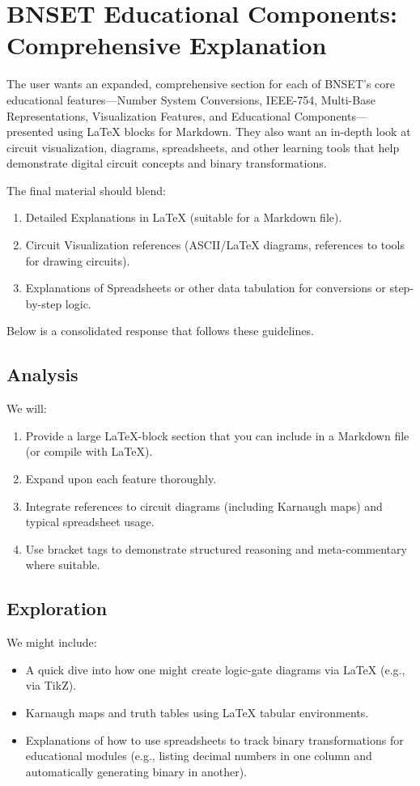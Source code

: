 \documentclass{article}
\begin{document}
\section*{BNSET Educational Components: Comprehensive Explanation}

The user wants an expanded, comprehensive section for each of BNSET’s core educational features—Number System Conversions, IEEE-754, Multi-Base Representations, Visualization Features, and Educational Components—presented using \LaTeX{} blocks for Markdown. They also want an in-depth look at circuit visualization, diagrams, spreadsheets, and other learning tools that help demonstrate digital circuit concepts and binary transformations.

The final material should blend:
\begin{enumerate}
    \item Detailed Explanations in \LaTeX{} (suitable for a Markdown file).
    \item Circuit Visualization references (ASCII/\LaTeX{} diagrams, references to tools for drawing circuits).
    \item Explanations of Spreadsheets or other data tabulation for conversions or step-by-step logic.
\end{enumerate}

Below is a consolidated response that follows these guidelines.

\subsection*{Analysis}
We will:
\begin{enumerate}
    \item Provide a large \LaTeX{}-block section that you can include in a Markdown file (or compile with \LaTeX{}).
    \item Expand upon each feature thoroughly.
    \item Integrate references to circuit diagrams (including Karnaugh maps) and typical spreadsheet usage.
    \item Use bracket tags to demonstrate structured reasoning and meta-commentary where suitable.
\end{enumerate}

\subsection*{Exploration}
We might include:
\begin{itemize}
    \item A quick dive into how one might create logic-gate diagrams via \LaTeX{} (e.g., via TikZ).
    \item Karnaugh maps and truth tables using \LaTeX{} tabular environments.
    \item Explanations of how to use spreadsheets to track binary transformations for educational modules (e.g., listing decimal numbers in one column and automatically generating binary in another).
\end{itemize}
\end{document}
